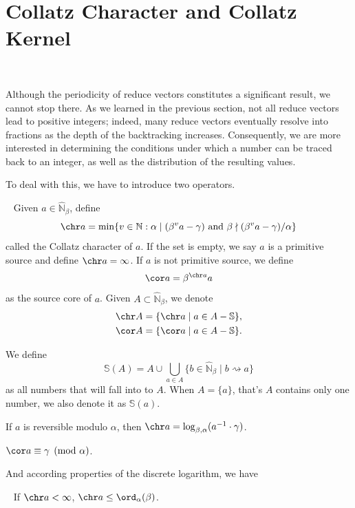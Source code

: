 \section{Collatz Character and Collatz Kernel}~\label{sec:collatz-character-and-collatz-kernel}

Although the periodicity of reduce vectors constitutes a significant result, we cannot stop there. As we learned in the previous section, not all reduce vectors lead to positive integers; indeed, many reduce vectors eventually resolve into fractions as the depth of the backtracking increases. Consequently, we are more interested in determining the conditions under which a number can be traced back to an integer, as well as the distribution of the resulting values.

To deal with this, we have to introduce two operators.
\begin{definition}~\label{def:collatz-character-and-collatz-kernel}
Given $a \in\widehat{\mathbb{N}}_\beta$, define
\[ \chr a = \min\{v\in\mathbb{N}: \alpha\mid(\beta^{v}a-\gamma) \text{ and } \beta\nmid(\beta^{v}a-\gamma)/\alpha \} \]
called the Collatz character of $a$. If the set is empty, we say $a$ is a primitive source and define $\chr a = \infty$.
If $a$ is not primitive source, we define
\[ \cor a = \beta^{\chr a}a \]
as the source core of $a$.
Given $A \subset \widehat{\mathbb{N}}_\beta$, we denote
\begin{align*}
    \chr A &= \{ \chr a \mid a\in A - \mathbb{S}\}, \\
    \cor A &= \{ \cor a \mid a\in A - \mathbb{S}\}.
\end{align*}
\end{definition}
\begin{definition}
We define
\[\mathbb{S}(A) = A\cup\bigcup_{a\in A}\{ b\in \widehat{\mathbb{N}}_{\beta} \mid b\rightsquigarrow a \}\]
as all numbers that will fall into to $A$.
When $A = \{a\}$, that's $A$ contains only one number, we also denote it as $\mathbb{S}(a)$.
\end{definition}
\begin{proposition}
    If $a$ is reversible modulo $\alpha$, then $\chr a = \log_{\beta, \alpha}(a^{-1}\cdot \gamma)$.
\end{proposition}
\begin{proposition}
    $\cor a\equiv \gamma \pmod{\alpha}$.
\end{proposition}
And according properties of the discrete logarithm, we have
\begin{proposition}~\label{prop:chr-le-ord}
    If $\chr a < \infty$, $\chr a \le \ord_{\alpha}(\beta)$.
\end{proposition}
